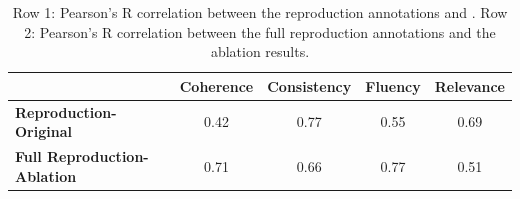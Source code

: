 \begin{table}[h]
\centering
\begin{tabular}{|l|c|c|c|c|}
\hline
                             & \textbf{Coherence} & \textbf{Consistency} & \textbf{Fluency} & \textbf{Relevance} \\ \hline
\textbf{Reproduction-Original} & 0.42               & 0.77                 & 0.55             & 0.69               \\ \hline
\textbf{Full Reproduction-Ablation} & 0.71               & 0.66                 & 0.77             & 0.51               \\ \hline


\end{tabular}
\caption{Row 1: Pearson's R correlation between the reproduction annotations and \citet{gao2022dialsummeval}. Row 2: Pearson's R correlation between the full reproduction annotations and the ablation results.}
\label{corr}
\end{table}




